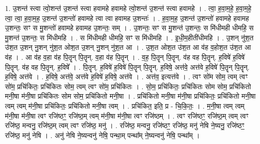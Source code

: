 \documentclass[17pt]{extarticle}
\begin{document}
1. उ॒शन्त॑ स्त्वा त्वो॒शन्त॑ उ॒शन्त॑ स्त्वा हवामहे हवामहे त्वो॒शन्त॑ उ॒शन्त॑ स्त्वा हवामहे । . त्वा॒ ह॒वा॒म॒हे॒ ह॒वा॒म॒हे॒ त्वा॒ त्वा॒ ह॒वा॒म॒ह॒ उ॒शन्त॑ उ॒शन्तो॑ हवामहे त्वा त्वा हवामह उ॒शन्तः॑ । . ह॒वा॒म॒ह॒ उ॒शन्त॑ उ॒शन्तो॑ हवामहे हवामह उ॒शन्तः॒ सꣳ स मु॒शन्तो॑ हवामहे हवामह उ॒शन्तः॒ सम् । . उ॒शन्तः॒ सꣳ स मु॒शन्त॑ उ॒शन्तः॒ स मि॑धीमही धीमहि॒ स मु॒शन्त॑ उ॒शन्तः॒ स मि॑धीमहि । . स मि॑धीमही धीमहि॒ सꣳ स मि॑धीमहि । . इ॒धी॒म॒हीती॑धीमहि । . उ॒शन् नु॑श॒त उ॑श॒त उ॒शन् नु॒शन् नु॑श॒त ओश॒त उ॒शन् नु॒शन् नु॑श॒त आ । . उ॒श॒त ओश॒त उ॑श॒त आ व॑ह व॒होश॒त उ॑श॒त आ व॑ह । . आ व॑ह व॒हा व॑ह पि॒तॄन् पि॒तॄन्. व॒हा व॑ह पि॒तॄन् । . व॒ह॒ पि॒तॄन् पि॒तॄन्. व॑ह वह पि॒तॄन्. ह॒विषे॑ ह॒विषे॑ पि॒तॄन्. व॑ह वह पि॒तॄन्. ह॒विषे᳚ । . पि॒तॄन्. ह॒विषे॑ ह॒विषे॑ पि॒तॄन् पि॒तॄन्. ह॒विषे॒ अत्त॑वे॒ अत्त॑वे ह॒विषे॑ पि॒तॄन् पि॒तॄन्. ह॒विषे॒ अत्त॑वे । . ह॒विषे॒ अत्त॑वे॒ अत्त॑वे ह॒विषे॑ ह॒विषे॒ अत्त॑वे । . अत्त॑व॒ इत्यत्त॑वे । . त्वꣳ सो॑म सोम॒ त्वम् त्वꣳ सो॑म॒ प्रचि॑कितः॒ प्रचि॑कितः सोम॒ त्वम् त्वꣳ सो॑म॒ प्रचि॑कितः । . सो॒म॒ प्रचि॑कितः॒ प्रचि॑कितः सोम सोम॒ प्रचि॑कितो मनी॒षा म॑नी॒षा प्रचि॑कितः सोम सोम॒ प्रचि॑कितो मनी॒षा । . प्रचि॑कितो मनी॒षा म॑नी॒षा प्रचि॑कितः॒ प्रचि॑कितो मनी॒षा त्वम् त्वम् म॑नी॒षा प्रचि॑कितः॒ प्रचि॑कितो मनी॒षा त्वम् । . प्रचि॑कित॒ इति॒ प्र - चि॒कि॒तः॒ । . म॒नी॒षा त्वम् त्वम् म॑नी॒षा म॑नी॒षा त्वꣳ रजि॑ष्ठꣳ॒॒ रजि॑ष्ठ॒म् त्वम् म॑नी॒षा म॑नी॒षा त्वꣳ रजि॑ष्ठम् । . त्वꣳ रजि॑ष्ठꣳ॒॒ रजि॑ष्ठ॒म् त्वम् त्वꣳ रजि॑ष्ठ॒ मन्वनु॒ रजि॑ष्ठ॒म् त्वम् त्वꣳ रजि॑ष्ठ॒ मनु॑ । . रजि॑ष्ठ॒ मन्वनु॒ रजि॑ष्ठꣳ॒॒ रजि॑ष्ठ॒ मनु॑ नेषि ने॒ष्यनु॒ रजि॑ष्ठꣳ॒॒ रजि॑ष्ठ॒ मनु॑ नेषि । . अनु॑ नेषि ने॒ष्यन्वनु॑ नेषि॒ पन्था॒म् पन्था᳚म् ने॒ष्यन्वनु॑ नेषि॒ पन्था᳚म् । \newline
\end{document}
